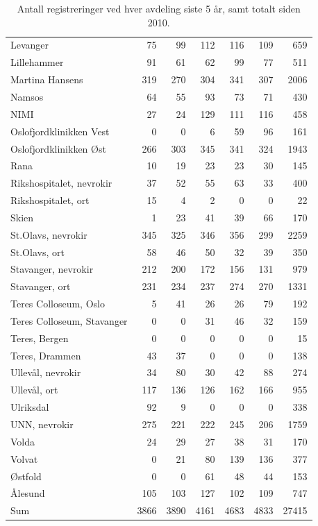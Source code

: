 \documentclass [norsk,a4paper,twoside]{article}\usepackage[]{graphicx}\usepackage[]{color}
\begin{document}
\begin{table}[ht]
\begin{tabular}{lrrrrrr}
  Levanger & 75 & 99 & 112 & 116 & 109 & 659 \\ 
  Lillehammer & 91 & 61 & 62 & 99 & 77 & 511 \\ 
  Martina Hansens & 319 & 270 & 304 & 341 & 307 & 2006 \\ 
  Namsos & 64 & 55 & 93 & 73 & 71 & 430 \\ 
  NIMI & 27 & 24 & 129 & 111 & 116 & 458 \\ 
  Oslofjordklinikken Vest & 0 & 0 & 6 & 59 & 96 & 161 \\ 
  Oslofjordklinikken Øst & 266 & 303 & 345 & 341 & 324 & 1943 \\ 
  Rana & 10 & 19 & 23 & 23 & 30 & 145 \\ 
  Rikshospitalet, nevrokir & 37 & 52 & 55 & 63 & 33 & 400 \\ 
  Rikshospitalet, ort & 15 & 4 & 2 & 0 & 0 & 22 \\ 
  Skien & 1 & 23 & 41 & 39 & 66 & 170 \\ 
  St.Olavs, nevrokir & 345 & 325 & 346 & 356 & 299 & 2259 \\ 
  St.Olavs, ort & 58 & 46 & 50 & 32 & 39 & 350 \\ 
  Stavanger, nevrokir & 212 & 200 & 172 & 156 & 131 & 979 \\ 
  Stavanger, ort & 231 & 234 & 237 & 274 & 270 & 1331 \\ 
  Teres Colloseum, Oslo & 5 & 41 & 26 & 26 & 79 & 192 \\ 
  Teres Colloseum, Stavanger & 0 & 0 & 31 & 46 & 32 & 159 \\ 
  Teres, Bergen & 0 & 0 & 0 & 0 & 0 & 15 \\ 
  Teres, Drammen & 43 & 37 & 0 & 0 & 0 & 138 \\ 
  Ullevål, nevrokir & 34 & 80 & 30 & 42 & 88 & 274 \\ 
  Ullevål, ort & 117 & 136 & 126 & 162 & 166 & 955 \\ 
  Ulriksdal & 92 & 9 & 0 & 0 & 0 & 338 \\ 
  UNN, nevrokir & 275 & 221 & 222 & 245 & 206 & 1759 \\ 
  Volda & 24 & 29 & 27 & 38 & 31 & 170 \\ 
  Volvat & 0 & 21 & 80 & 139 & 136 & 377 \\ 
  Østfold & 0 & 0 & 61 & 48 & 44 & 153 \\ 
  Ålesund & 105 & 103 & 127 & 102 & 109 & 747 \\ 
  Sum & 3866 & 3890 & 4161 & 4683 & 4833 & 27415 \\ 
   \hline
\end{tabular}
\caption{Antall registreringer ved hver avdeling siste 5 år, samt totalt siden 2010.} 
\label{tab:AntReg}
\end{table}
\end{document}
